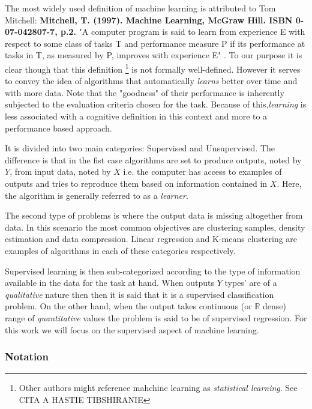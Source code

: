 The most widely used definition of machine learning is attributed to Tom Mitchell: 	\textbf{Mitchell, T. (1997). Machine Learning, McGraw Hill. ISBN 0-07-042807-7, p.2.} 
"A computer program is said to learn from experience E with respect to some class of tasks T and performance measure P if its performance at tasks in T, as measured by P, improves with experience E" . To our purpose it is clear though that this definition \footnote{Other authors might reference mahchine learning as \textit{statistical learning}. See CITA A HASTIE TIBSHIRANIE} is not formally well-defined. However it serves to convey the idea of algorithms that automatically \textit{learns} better over time and with more data. Note that the "goodness" of their performance is inherently subjected to the evaluation criteria chosen for the task. Because of this,\textit{learning} is less associated with a cognitive definition in this context and more to a performance based approach.


It is divided into two main categories: Supervised and Unsupervised. The difference is that in the fist case algorithms are set to produce outputs, noted by $Y$, from input data, noted by $X$ i.e. the computer has access to examples of outputs and tries to reproduce them based on information contained in $X$. Here, the algorithm is generally referred to as a \textit{learner}.

The second type of problems is where the output data is missing altogether from data. In this scenario the most common objectives are clustering samples, density estimation and data compression. Linear regression and K-means clustering are examples of algorithms in each of these categories respectively.

Supervised learning is then sub-categorized according to the type of information available in the data for the task at hand. When outputs $Y$ types' are of a \textit{qualitative} nature then then it is said that it is a supervised classification problem. On the other hand, when the output takes continuous (or $\mathbb{R}$ dense) range of \textit{quantitative} values the problem is said to be of supervised regression. For this work we will focus on the supervised aspect of machine learning.

\subsubsection{Notation}

